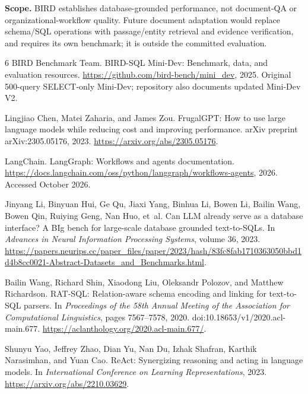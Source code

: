 \documentclass{article}
\begin{document}
\textbf{Scope.} BIRD establishes database-grounded performance, not document-QA or organizational-workflow quality. Future document adaptation would replace schema/SQL operations with passage/entity retrieval and evidence verification, and requires its own benchmark; it is outside the committed evaluation.

\clearpage
\begin{thebibliography}{6}
BIRD Benchmark Team.
\newblock BIRD-SQL Mini-Dev: Benchmark, data, and evaluation resources.
\newblock \url{https://github.com/bird-bench/mini_dev}, 2025.
\newblock Original 500-query SELECT-only Mini-Dev; repository also documents updated Mini-Dev V2.

Lingjiao Chen, Matei Zaharia, and James Zou.
\newblock FrugalGPT: How to use large language models while reducing cost and improving performance.
\newblock arXiv preprint arXiv:2305.05176, 2023.
\newblock \url{https://arxiv.org/abs/2305.05176}.

LangChain.
\newblock LangGraph: Workflows and agents documentation.
\newblock \url{https://docs.langchain.com/oss/python/langgraph/workflows-agents}, 2026.
\newblock Accessed October 2026.

Jinyang Li, Binyuan Hui, Ge Qu, Jiaxi Yang, Binhua Li, Bowen Li, Bailin Wang, Bowen Qin, Ruiying Geng, Nan Huo, et~al.
\newblock Can LLM already serve as a database interface? A BIg bench for large-scale database grounded text-to-SQLs.
\newblock In \emph{Advances in Neural Information Processing Systems}, volume 36, 2023.
\newblock \url{https://papers.neurips.cc/paper_files/paper/2023/hash/83fc8fab1710363050bbd1d4b8cc0021-Abstract-Datasets_and_Benchmarks.html}.

Bailin Wang, Richard Shin, Xiaodong Liu, Oleksandr Polozov, and Matthew Richardson.
\newblock RAT-SQL: Relation-aware schema encoding and linking for text-to-SQL parsers.
\newblock In \emph{Proceedings of the 58th Annual Meeting of the Association for Computational Linguistics}, pages 7567--7578, 2020.
\newblock doi:10.18653/v1/2020.acl-main.677.
\newblock \url{https://aclanthology.org/2020.acl-main.677/}.

Shunyu Yao, Jeffrey Zhao, Dian Yu, Nan Du, Izhak Shafran, Karthik Narasimhan, and Yuan Cao.
\newblock ReAct: Synergizing reasoning and acting in language models.
\newblock In \emph{International Conference on Learning Representations}, 2023.
\newblock \url{https://arxiv.org/abs/2210.03629}.
\end{thebibliography}
\end{document}
